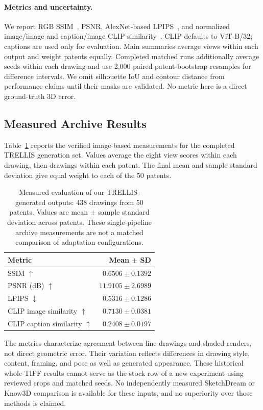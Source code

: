 \paragraph{Metrics and uncertainty.}
We report RGB SSIM~\cite{wang2004ssim}, PSNR, AlexNet-based
LPIPS~\cite{zhang2018lpips}, and normalized image/image and caption/image CLIP
similarity~\cite{radford2021clip}. CLIP defaults to ViT-B/32; captions are used
only for evaluation. Main summaries average views within each output and weight
patents equally. Completed matched runs additionally average seeds within each
drawing and use 2,000 paired patent-bootstrap resamples for difference intervals.
We omit silhouette IoU and contour distance from performance claims until their
masks are validated. No metric here is a direct ground-truth 3D error.

\subsection{Measured Archive Results}
Table~\ref{tab:archive_results} reports the verified image-based measurements
for the completed TRELLIS generation set. Values average the eight view scores within
each drawing, then drawings within each patent. The final mean and sample
standard deviation give equal weight to each of the 50 patents.

\begin{table}[t]
\centering\small
\caption{Measured evaluation of our TRELLIS-generated outputs: 438 drawings from
50 patents. Values are mean $\pm$ sample standard deviation across patents.
These single-pipeline archive measurements are not a matched comparison of
adaptation configurations.}
\label{tab:archive_results}
\begin{tabular*}{\columnwidth}{@{\extracolsep{\fill}}lr@{}}
\toprule
Metric & Mean $\pm$ SD \\
\midrule
SSIM $\uparrow$ & $0.6506\pm0.1392$ \\
PSNR (dB) $\uparrow$ & $11.9105\pm2.6989$ \\
LPIPS $\downarrow$ & $0.5316\pm0.1286$ \\
CLIP image similarity $\uparrow$ & $0.7130\pm0.0381$ \\
CLIP caption similarity $\uparrow$ & $0.2408\pm0.0197$ \\
\bottomrule
\end{tabular*}
\end{table}

The metrics characterize agreement between line drawings and shaded renders,
not direct geometric error. Their variation reflects differences in drawing
style, content, framing, and pose as well as generated appearance. These
historical whole-TIFF results cannot serve as the stock row of a new experiment
using reviewed crops and matched seeds. No independently measured SketchDream
or Know3D comparison is available for these inputs, and no superiority over
those methods is claimed.


